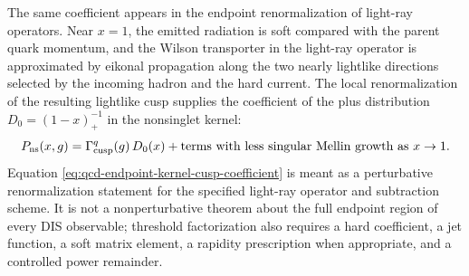 The same coefficient appears in the endpoint renormalization of light-ray
operators.  Near \(x=1\), the emitted radiation is soft compared with the
parent quark momentum, and the Wilson transporter in the light-ray operator
is approximated by eikonal propagation along the two nearly lightlike
directions selected by the incoming hadron and the hard current.  The local
renormalization of the resulting lightlike cusp supplies the coefficient of
the plus distribution \(D_0=(1-x)^{-1}_+\) in the nonsinglet kernel:
\begin{equation}
  P_{\rm ns}(x,g)
  =
  \Gamma_{\rm cusp}^q(g)\,D_0(x)
  +\text{terms with less singular Mellin growth as }x\to1 .
  \label{eq:qcd-endpoint-kernel-cusp-coefficient}
\end{equation}
Equation \eqref{eq:qcd-endpoint-kernel-cusp-coefficient} is meant as a
perturbative renormalization statement for the specified light-ray operator
and subtraction scheme.  It is not a nonperturbative theorem about the full
endpoint region of every DIS observable; threshold factorization also
requires a hard coefficient, a jet function, a soft matrix element, a
rapidity prescription when appropriate, and a controlled power remainder.

